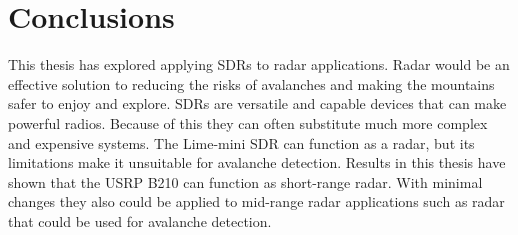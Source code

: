 \chapter{Conclusions}
\label{ch:conclusions}

This thesis has explored applying SDRs to radar applications.
Radar would be an effective solution to reducing the risks of avalanches
and making the mountains safer to enjoy and explore.
SDRs are versatile and capable devices that can make powerful radios.
Because of this they can often substitute much more complex and expensive systems.
The Lime-mini SDR can function as a radar, but its limitations make it unsuitable for avalanche detection.
Results in this thesis have shown that the USRP B210 can function as short-range radar.
With minimal changes they also could be applied to mid-range radar applications
such as radar that could be used for avalanche detection.




